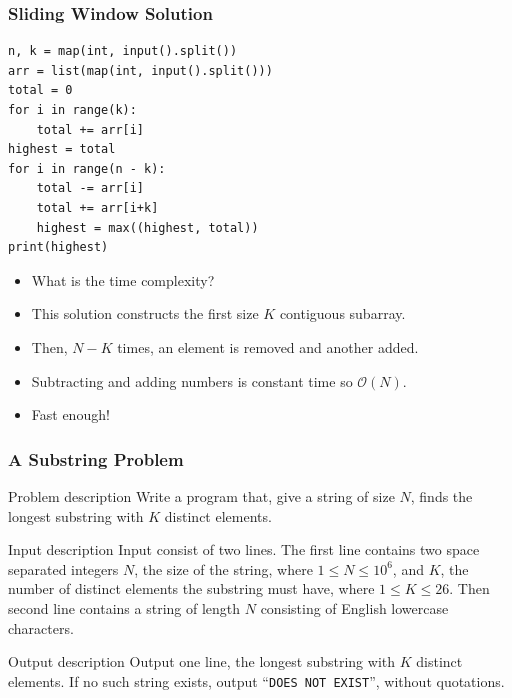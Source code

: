 \documentclass[10pt]{beamer}
\begin{document}
\begin{frame}
    \frametitle{Sliding Window Solution}
	\begin{scriptsize}
        \begin{verbatim}
n, k = map(int, input().split())
arr = list(map(int, input().split()))
total = 0
for i in range(k):
    total += arr[i]
highest = total
for i in range(n - k):
    total -= arr[i]
    total += arr[i+k]
    highest = max((highest, total))
print(highest)
        \end{verbatim}
    \end{scriptsize}
    \begin{itemize}
        \item<2-> What is the time complexity?
        \item<3-> This solution constructs the first size $K$ contiguous subarray.
        \item<4-> Then, $N-K$ times, an element is removed and another added.
        \item<5-> Subtracting and adding numbers is constant time so $\mathcal{O}(N)$.
        \item<6-> Fast enough!
    \end{itemize}
\end{frame}

\begin{frame}[plain]
	\frametitle{A Substring Problem}
	\begin{block}{Problem description}
    	    Write a program that, give a string of size $N$, finds the
            longest substring with $K$ distinct elements.
    \end{block}

    \vspace{10pt}
    
    \begin{block}{Input description}
            Input consist of two lines.
            The first line contains two space separated integers $N$, the size of the string, where $1 \leq N \leq 10^6$,
    and $K$, the number of distinct elements the substring must have, where $1 \leq K \leq 26$.
            Then second line contains a string of length $N$ consisting of English lowercase characters.
    \end{block}

    \vspace{10pt}
    
    \begin{block}{Output description}
            Output one line, the longest substring with $K$ distinct elements.
            If no such string exists, output ``\texttt{DOES NOT EXIST}'', without quotations.
    \end{block}
\end{frame}
\end{document}
